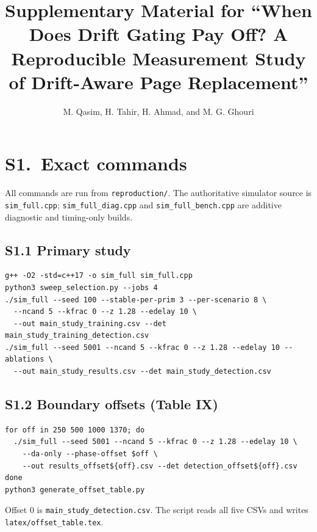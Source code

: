 \documentclass[journal]{IEEEtran}
\begin{document}
\title{Supplementary Material for ``When Does Drift Gating Pay Off? A
Reproducible Measurement Study of Drift-Aware Page Replacement''}
\author{M. Qasim, H. Tahir, H. Ahmad, and M. G. Ghouri}
\maketitle

\section{S1.\ Exact commands}

All commands are run from \texttt{reproduction/}. The authoritative simulator
source is \texttt{sim_full.cpp}; \texttt{sim\_full\_diag.cpp} and
\texttt{sim\_full\_bench.cpp} are additive diagnostic and timing-only builds.

\subsection{S1.1 Primary study}
\begin{verbatim}
g++ -O2 -std=c++17 -o sim_full sim_full.cpp
python3 sweep_selection.py --jobs 4
./sim_full --seed 100 --stable-per-prim 3 --per-scenario 8 \
  --ncand 5 --kfrac 0 --z 1.28 --edelay 10 \
  --out main_study_training.csv --det main_study_training_detection.csv
./sim_full --seed 5001 --ncand 5 --kfrac 0 --z 1.28 --edelay 10 --ablations \
  --out main_study_results.csv --det main_study_detection.csv
\end{verbatim}

\subsection{S1.2 Boundary offsets (Table IX)}
\begin{verbatim}
for off in 250 500 1000 1370; do
  ./sim_full --seed 5001 --ncand 5 --kfrac 0 --z 1.28 --edelay 10 \
    --da-only --phase-offset $off \
    --out results_offset${off}.csv --det detection_offset${off}.csv
done
python3 generate_offset_table.py
\end{verbatim}
Offset 0 is \texttt{main\_study\_detection.csv}. The script reads all five
CSVs and writes \texttt{latex/offset\_table.tex}.
\end{document}
